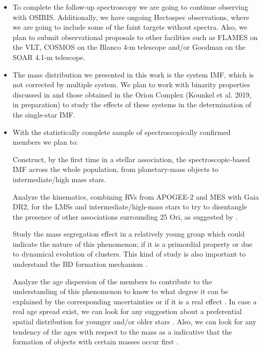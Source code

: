 \documentclass[12pt]{article}
\begin{document}
\begin{itemize}
	\item To complete the follow-up spectroscopy we are going to continue observing with OSIRIS. Additionally, we have ongoing Hectospec observations, where we are going to include some of the faint targets without spectra. Also, we plan to submit observational proposals to other facilities such as FLAMES on the VLT, COSMOS on the Blanco 4-m telescope and/or Goodman on the SOAR 4.1-m telescope. 
	\item The mass distribution we presented in this work is the system IMF, which is not corrected by multiple system. We plan to work with binarity properties discussed in \citet{Duchene2018} and those obtained in the Orion Complex (Kounkel et al. 2019, in preparation) to study the effects of these systems in the determination of the single-star IMF.
	\item With the statistically complete sample of spectroscopically confirmed members we plan to: \par
		Construct, by the first time in a stellar association, the spectroscopic-based IMF across the whole population, from planetary-mass objects to intermediate/high mass stars. \par
		Analyze the kinematics, combining RVs from APOGEE-2 and MES with Gaia DR2, for the LMSs and intermediate/high-mass stars to try to disentangle the presence of other associations surrounding 25 Ori, as suggested by \citet{Kounkel2018,Briceno2018}. \par
		Study the mass segregation effect in a relatively young group which could indicate the nature of this phenomenon; if it is a primordial property \citep{Bonnell-Davies1998,Bonnell2001} or due to dynamical evolution \citep{Kroupa2001a,Kroupa2001b} of clusters. This kind of study is also important to understand the BD formation mechanism \citep{Reipurth-Clarke2001,Padoan-Nordlund2002,Whitworth-Zinnecker2004}. \par %
		Analyze the age dispersion of the members to contribute to the understanding of this phenomenon to know to what degree it can be explained by the corresponding uncertainties or if it is a real effect \citep{Palla-Stahler1999,Palla-Stahler2000}. In case a real age spread exist, we can look for any suggestion about a preferential spatial distribution for younger and/or older stars \citep{Beccari2017}. Also, we can look for any tendency of the ages with respect to the mass as a indicative that the formation of objects with certain masses occur first \citep{Vazquez-Semadeni2017}. \par

\end{itemize}
\end{document}

